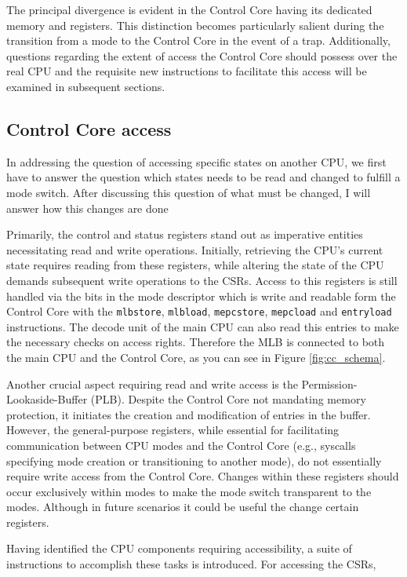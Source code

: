 The principal divergence is evident in the Control Core having its dedicated
memory and registers. This distinction becomes particularly salient during the
transition from a mode to the Control Core in the event of a trap. Additionally,
questions regarding the extent of access the Control Core should possess over
the real CPU and the requisite new instructions to facilitate this access will
be examined in subsequent sections.

\subsection{Control Core access}
In addressing the question of accessing specific states on another CPU,
we first have to answer the question which states needs to be read and
changed to fulfill a mode switch. After discussing this question of what must be
changed, I will answer how this changes are done\par
Primarily, the control and status registers stand out as imperative entities
necessitating read and write operations. Initially, retrieving the CPU's current
state requires reading from these registers, while altering the state of the CPU demands
subsequent write operations to the CSRs. Access to this registers is still
handled via the bits in the mode descriptor which is write and readable form the
Control Core with the \texttt{mlbstore}, \texttt{mlbload}, \texttt{mepcstore},
\texttt{mepcload} and \texttt{entryload} instructions. The decode unit of the
main CPU can also read this entries to make the necessary checks on access
rights. Therefore the MLB is connected to both the main CPU and the Control
Core, as you can see in Figure \ref{fig:cc_schema}.\par
Another crucial aspect requiring read and write access is the
Permission-Lookaside-Buffer (PLB). Despite the Control Core not mandating memory
protection, it initiates the creation and modification of entries in the buffer.
However, the general-purpose registers, while essential for facilitating communication
between CPU modes and the Control Core (e.g., syscalls specifying mode creation
or transitioning to another mode), do not essentially require write access from
the Control Core. Changes within these registers should occur exclusively within
modes to make the mode switch transparent to the modes. Although in future scenarios it
could be useful the change certain registers.\par
Having identified the CPU components requiring accessibility, a suite of
instructions to accomplish these tasks is introduced. For accessing the CSRs,
